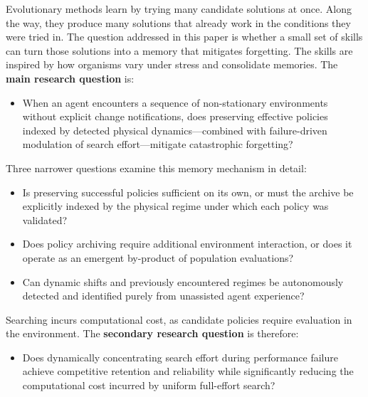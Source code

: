 Evolutionary methods learn by trying many candidate solutions at once. Along the way, they produce many solutions that already work in the conditions they were tried in. The question addressed in this paper is whether a small set of skills can turn those solutions into a memory that mitigates forgetting. The skills are inspired by how organisms vary under stress and consolidate memories. The \textbf{main research question} is:
\begin{itemize}[]
\item[\textbf{RQ1}] When an agent encounters a sequence of non-stationary environments without explicit change notifications, does preserving effective policies indexed by detected physical dynamics—combined with failure-driven modulation of search effort—mitigate catastrophic forgetting?
\end{itemize}
Three narrower questions examine this memory mechanism in detail:
\begin{itemize}[]
\item[\textbf{RQ1a}] Is preserving successful policies sufficient on its own, or must the archive be explicitly indexed by the physical regime under which each policy was validated?
\item[\textbf{RQ1b}] Does policy archiving require additional environment interaction, or does it operate as an emergent by-product of population evaluations?
\item[\textbf{RQ1c}] Can dynamic shifts and previously encountered regimes be autonomously detected and identified purely from unassisted agent experience?
\end{itemize}
Searching incurs computational cost, as candidate policies require evaluation in the environment. The \textbf{secondary research question} is therefore:
\begin{itemize}[]
\item[\textbf{RQ2}] Does dynamically concentrating search effort during performance failure achieve competitive retention and reliability while significantly reducing the computational cost incurred by uniform full-effort search?
\end{itemize}

